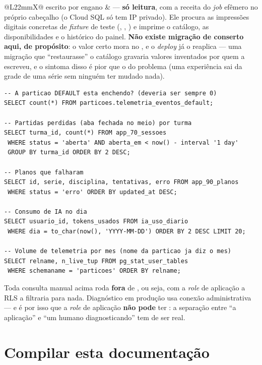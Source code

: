\begin{tabularx}{\linewidth}{@{}L{22mm}X@{}}
  escrito por engano &  ---
  \textbf{só leitura}, com a receita do \emph{job} efêmero no próprio cabeçalho
  (o Cloud SQL só tem IP privado). Ele procura as impressões digitais concretas
  de \emph{fixture} de teste (, ,
  ) e imprime o catálogo, as disponibilidades e o
  histórico do painel. \textbf{Não existe migração de conserto aqui, de
  propósito}: o valor certo mora no , e o
  \emph{deploy} já o reaplica --- uma migração que \enquote{restaurasse} o
  catálogo gravaria valores inventados por quem a escreveu, e o sintoma disso é
  pior que o do problema (uma experiência sai da grade de uma série sem ninguém
  ter mudado nada).\\
\bottomrule
\end{tabularx}

\begin{lstlisting}[language=sqlunoo, caption={As consultas do \emph{checklist}}]
-- A particao DEFAULT esta enchendo? (deveria ser sempre 0)
SELECT count(*) FROM particoes.telemetria_eventos_default;

-- Partidas perdidas (aba fechada no meio) por turma
SELECT turma_id, count(*) FROM app_70_sessoes
 WHERE status = 'aberta' AND aberta_em < now() - interval '1 day'
 GROUP BY turma_id ORDER BY 2 DESC;

-- Planos que falharam
SELECT id, serie, disciplina, tentativas, erro FROM app_90_planos
 WHERE status = 'erro' ORDER BY updated_at DESC;

-- Consumo de IA no dia
SELECT usuario_id, tokens_usados FROM ia_uso_diario
 WHERE dia = to_char(now(), 'YYYY-MM-DD') ORDER BY 2 DESC LIMIT 20;

-- Volume de telemetria por mes (nome da particao ja diz o mes)
SELECT relname, n_live_tup FROM pg_stat_user_tables
 WHERE schemaname = 'particoes' ORDER BY relname;
\end{lstlisting}

\begin{atencao}
Toda consulta manual acima roda \textbf{fora} de , ou seja, com a
\emph{role} de aplicação a RLS a filtraria para nada. Diagnóstico em produção usa
conexão administrativa --- e é por isso que a \emph{role} de aplicação
\textbf{não pode} ter : a separação entre \enquote{a aplicação} e
\enquote{um humano diagnosticando} tem de ser real.
\end{atencao}

\section{Compilar esta documentação}

